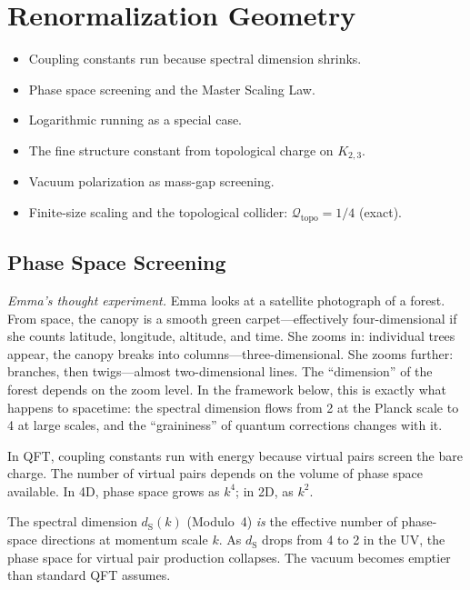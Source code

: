 \documentclass[11pt, a4paper, openany]{book}
\newcommand{\dS}{d_{\mathrm{S}}}
\newcounter{thm}[chapter]
\newenvironment{introduction}[1][Modulo Overview]{%
  \begin{tcolorbox}[
    enhanced,colback=structure!5,colframe=structure,
    colbacktitle=structure,coltitle=white,
    fonttitle=\small\bfseries,title={#1},
    arc=2pt,boxrule=0.7pt,
    left=8pt,right=8pt,top=6pt,bottom=6pt,
    before skip=12pt,after skip=12pt
  ]\itshape\begin{itemize}[leftmargin=*,itemsep=2pt,parsep=0pt]
}{%
  \end{itemize}\end{tcolorbox}
}
\begin{document}
\chapter{Renormalization Geometry}\label{ch:renorm}

\begin{introduction}
  \item Coupling constants run because spectral dimension shrinks.
  \item Phase space screening and the Master Scaling Law.
  \item Logarithmic running as a special case.
  \item The fine structure constant from topological charge on $K_{2,3}$.
  \item Vacuum polarization as mass-gap screening.
  \item Finite-size scaling and the topological collider:
    $\mathcal{Q}_{\mathrm{topo}} = 1/4$ (exact).
\end{introduction}

\section{Phase Space Screening}\label{sec:phase-screening}

\smallskip\noindent
\textit{Emma's thought experiment.}
Emma looks at a satellite photograph of a forest. From space, the canopy
is a smooth green carpet---effectively four-dimensional if she counts
latitude, longitude, altitude, and time. She zooms in: individual trees
appear, the canopy breaks into columns---three-dimensional. She zooms
further: branches, then twigs---almost two-dimensional lines. The
``dimension'' of the forest depends on the zoom level. In the framework
below, this is exactly what happens to spacetime: the spectral dimension
flows from 2 at the Planck scale to 4 at large scales, and the
``graininess'' of quantum corrections changes with it.
\smallskip

\noindent
In QFT, coupling constants run with energy because virtual pairs screen
the bare charge. The number of virtual pairs depends on the volume of
phase space available. In 4D, phase space grows as $k^4$; in 2D, as
$k^2$.

The spectral dimension $\dS(k)$ (Modulo~4) \emph{is} the effective
number of phase-space directions at momentum scale $k$. As $\dS$ drops
from 4 to 2 in the UV, the phase space for virtual pair production
collapses. The vacuum becomes emptier than standard QFT assumes.
\end{document}
